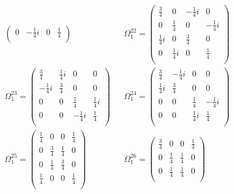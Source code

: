 \begin{align*}
\begin{pmatrix}
    0  &  -\frac{1}{4}i  &  0  &  \frac{1}{4}  \\
    \end{pmatrix}
    &&
    \Omega_{1}^{22} = 
    \begin{pmatrix}
    \frac{3}{4}  &  0  &  -\frac{1}{4}i  &  0  \\
    0  &  \frac{1}{4}  &  0  &  -\frac{1}{4}i  \\
    \frac{1}{4}i  &  0  &  \frac{3}{4}  &  0  \\
    0  &  \frac{1}{4}i  &  0  &  \frac{1}{4}  \\
    \end{pmatrix}
    \\
    \Omega_{1}^{23} = 
    \begin{pmatrix}
    \frac{3}{4}  &  \frac{1}{4}i  &  0  &  0  \\
    -\frac{1}{4}i  &  \frac{3}{4}  &  0  &  0  \\
    0  &  0  &  \frac{1}{4}  &  \frac{1}{4}i  \\
    0  &  0  &  -\frac{1}{4}i  &  \frac{1}{4}  \\
    \end{pmatrix}
    &&
    \Omega_{1}^{24} = 
    \begin{pmatrix}
    \frac{3}{4}  &  -\frac{1}{4}i  &  0  &  0  \\
    \frac{1}{4}i  &  \frac{3}{4}  &  0  &  0  \\
    0  &  0  &  \frac{1}{4}  &  -\frac{1}{4}i  \\
    0  &  0  &  \frac{1}{4}i  &  \frac{1}{4}  \\
    \end{pmatrix}
    \\
    \Omega_{1}^{25} = 
    \begin{pmatrix}
    \frac{1}{4}  &  0  &  0  &  \frac{1}{4}  \\
    0  &  \frac{3}{4}  &  \frac{1}{4}  &  0  \\
    0  &  \frac{1}{4}  &  \frac{3}{4}  &  0  \\
    \frac{1}{4}  &  0  &  0  &  \frac{1}{4}  \\
    \end{pmatrix}
    &&
    \Omega_{1}^{26} = 
    \begin{pmatrix}
    \frac{3}{4}  &  0  &  0  &  \frac{1}{4}  \\
    0  &  \frac{1}{4}  &  \frac{1}{4}  &  0  \\
    0  &  \frac{1}{4}  &  \frac{1}{4}  &  0  \\

\end{pmatrix}
\end{align*}
